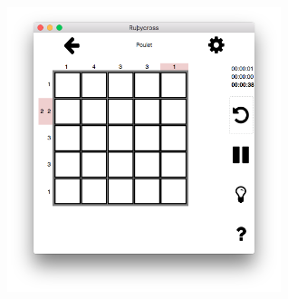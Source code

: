 \documentclass[a4paper, 12pt]{report}
\begin{document}
            \begin{minipage}{\linewidth}
                    \centering
			        \includegraphics[width=8cm]{imageGrilleJeu.png}
	        \end{minipage}
            
\end{document}
